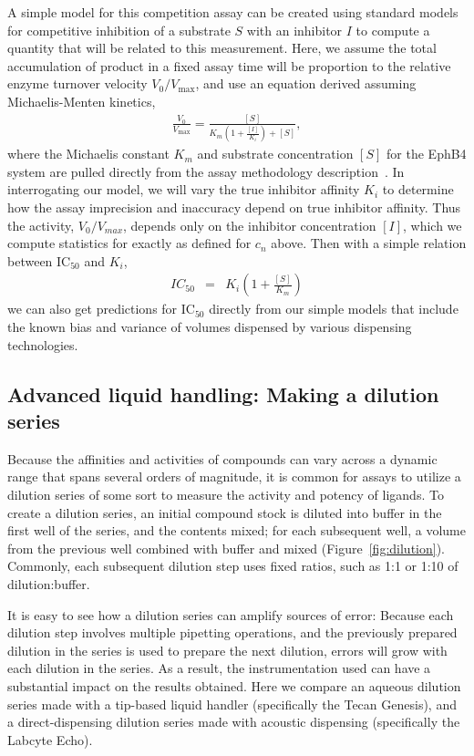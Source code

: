 \documentclass[aps,pre,twocolumn,nofootinbib,superscriptaddress,linenumbers]{revtex4-1}
\begin{document}
A simple model for this competition assay can be created using standard models for competitive inhibition of a substrate $S$ with an inhibitor $I$ to compute a quantity that will be related to this measurement. 
Here, we assume the total accumulation of product in a fixed assay time will be proportion to the relative enzyme turnover velocity $V_0 / V_\mathrm{max}$, and use an equation derived assuming Michaelis-Menten kinetics,
\begin{eqnarray}
\frac{V_{0}}{V_\mathrm{max}} = \frac{[S]}{K_{m}(1+\frac{[I]}{K_{i}})+[S]} \label{equation:activity} ,
\end{eqnarray}
where the Michaelis constant $K_{m}$ and substrate concentration $[S]$ for the EphB4 system are pulled directly from the assay methodology description~\cite{barlaam_novel_2009,barlaam_pyrimidine_2010}. 
In interrogating our model, we will vary the true inhibitor affinity $K_{i}$ to determine how the assay imprecision and inaccuracy depend on true inhibitor affinity.
Thus the activity, $V_{0}/V_{max}$, depends only on the inhibitor concentration $[I]$, which we compute statistics for exactly as defined for $c_n$ above.
Then with a simple relation between IC$_{50}$ and $K_{i}$,
\begin{eqnarray}
IC_{50} &=& K_{i}\left(1+\frac{[S]}{K_{m}}\right) \label{equation:IC50}
\end{eqnarray} 
we can also get predictions for IC$_{50}$ directly from our simple models that include the known bias and variance of volumes dispensed by various dispensing technologies.

\subsection*{Advanced liquid handling: Making a dilution series}

Because the affinities and activities of compounds can vary across a dynamic range that spans several orders of magnitude, it is common for assays to utilize a dilution series of some sort to measure the activity and potency of ligands. 
To create a dilution series, an initial compound stock is diluted into buffer in the first well of the series, and the contents mixed; for each subsequent well, a volume from the previous well combined with buffer and mixed (Figure~\ref{fig:dilution}).
Commonly, each subsequent dilution step uses fixed ratios, such as 1:1 or 1:10 of dilution:buffer.

It is easy to see how a dilution series can amplify sources of error:
Because each dilution step involves multiple pipetting operations, and the previously prepared dilution in the series is used to prepare the next dilution, errors will grow with each dilution in the series.
As a result, the instrumentation used can have a substantial impact on the results obtained.
Here we compare an aqueous dilution series made with a tip-based liquid handler (specifically the Tecan Genesis), and a direct-dispensing dilution series made with acoustic dispensing (specifically the Labcyte Echo).
\end{document}
